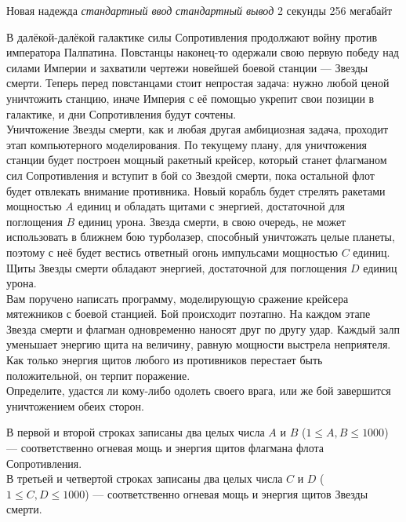 \begin{problem}%
{Новая надежда}%
{\textsl{стандартный ввод}}%
{\textsl{стандартный вывод}}%
{2 секунды}%
{256 мегабайт}{}

В далёкой-далёкой галактике силы Сопротивления продолжают войну против императора Палпатина. Повстанцы наконец-то одержали свою первую победу над силами Империи и захватили чертежи новейшей боевой станции — Звезды смерти. Теперь перед повстанцами стоит непростая задача: нужно любой ценой уничтожить станцию, иначе Империя с её помощью укрепит свои позиции в галактике, и дни Сопротивления будут сочтены.\\

Уничтожение Звезды смерти, как и любая другая амбициозная задача, проходит этап компьютерного моделирования. По текущему плану, для уничтожения станции будет построен мощный ракетный крейсер, который станет флагманом сил Сопротивления и вступит в бой со Звездой смерти, пока остальной флот будет отвлекать внимание противника. Новый корабль будет стрелять ракетами мощностью $A$ единиц и обладать щитами с энергией, достаточной для поглощения $B$ единиц урона. Звезда смерти, в свою очередь, не может использовать в ближнем бою турболазер, способный уничтожать целые планеты, поэтому с неё будет вестись ответный огонь импульсами мощностью $C$ единиц. Щиты Звезды смерти обладают энергией, достаточной для поглощения $D$ единиц урона.\\

Вам поручено написать программу, моделирующую сражение крейсера мятежников с боевой станцией. Бой происходит поэтапно. На каждом этапе Звезда смерти и флагман одновременно наносят друг по другу удар. Каждый залп уменьшает энергию щита на величину, равную мощности выстрела неприятеля. Как только энергия щитов любого из противников перестает быть положительной, он терпит поражение.\\

Определите, удастся ли кому-либо одолеть своего врага, или же бой завершится уничтожением обеих сторон.\\

\InputFile

В первой и второй строках записаны два целых числа $A$ и $B$ ($1 \le A, B \le 1000$) — соответственно огневая мощь и энергия щитов флагмана флота Сопротивления.\\

В третьей и четвертой строках записаны два целых числа $C$ и $D$ ($1 \le C, D \le 1000$) — соответственно огневая мощь и энергия щитов Звезды смерти.


\end{problem}
